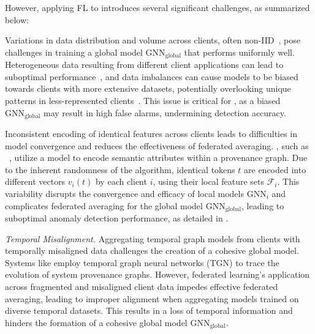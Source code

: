 However, applying FL to \pids introduces several significant challenges, as summarized below:

\begin{enumerate}[itemsep=0.1em, parsep=0em, topsep=0em, leftmargin=*]
   Variations in data distribution and volume across clients, often non-IID~\cite{zhao2018federated}, pose challenges in training a global model \( \text{GNN}_{\text{global}} \) that performs uniformly well. Heterogeneous data resulting from different client applications can lead to suboptimal performance~\cite{qu2022rethinking}, and data imbalances can cause models to be biased towards clients with more extensive datasets, potentially overlooking unique patterns in less-represented clients~\cite{duan2020self}. This issue is critical for \pids, as a biased \( \text{GNN}_{\text{global}} \) may result in high false alarms, undermining detection accuracy.

   Inconsistent encoding of identical features across clients leads to difficulties in model convergence and reduces the effectiveness of federated averaging. \pids, such as \flash~\cite{cheng2023kairos}, utilize a \wordvec model to encode semantic attributes within a provenance graph. Due to the inherent randomness of the \wordvec algorithm, identical tokens \( t \) are encoded into different vectors \( v_i(t) \) by each client \( i \), using their local feature sets \( \mathcal{F}_i \). This variability disrupts the convergence and efficacy of local \gnn models \( \text{GNN}_{i} \) and complicates federated averaging for the global \gnn model \( \text{GNN}_{\text{global}} \), leading to suboptimal anomaly detection performance, as detailed in \cite{zhou2023fedfa}.

   {\it Temporal Misalignment.} Aggregating temporal graph models from clients with temporally misaligned data challenges the creation of a cohesive global model. Systems like \kairos \cite{cheng2023kairos} employ temporal graph neural networks (TGN) to trace the evolution of system provenance graphs. However, federated learning's application across fragmented and misaligned client data impedes effective federated averaging, leading to improper alignment when aggregating models trained on diverse temporal datasets. This results in a loss of temporal information and hinders the formation of a cohesive global model \( \text{GNN}_{\text{global}} \).
  
\end{enumerate}

